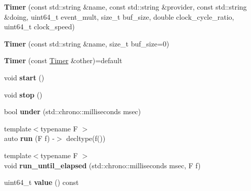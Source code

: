 \begin{DoxyCompactItemize}
\item 
\mbox{\label{class_botan_1_1_timer_a83d4e09f70865389d4aac62382e00d03}} 
{\bfseries Timer} (const std\+::string \&name, const std\+::string \&provider, const std\+::string \&doing, uint64\+\_\+t event\+\_\+mult, size\+\_\+t buf\+\_\+size, double clock\+\_\+cycle\+\_\+ratio, uint64\+\_\+t clock\+\_\+speed)
\item 
\mbox{\label{class_botan_1_1_timer_ac25601941a38110e97fac5f6e915f728}} 
{\bfseries Timer} (const std\+::string \&name, size\+\_\+t buf\+\_\+size=0)
\item 
\mbox{\label{class_botan_1_1_timer_a8274e31214574a6ca9770edadc092d93}} 
{\bfseries Timer} (const \mbox{\hyperlink{class_botan_1_1_timer}{Timer}} \&other)=default
\item 
\mbox{\label{class_botan_1_1_timer_a3631b1abb774a66a5c870f9d250d9edb}} 
void {\bfseries start} ()
\item 
\mbox{\label{class_botan_1_1_timer_a8d43e28fa369565ab503b13e85dd711f}} 
void {\bfseries stop} ()
\item 
\mbox{\label{class_botan_1_1_timer_a498b8a4251abb03f4a391f30b29260ff}} 
bool {\bfseries under} (std\+::chrono\+::milliseconds msec)
\item 
\mbox{\label{class_botan_1_1_timer_a71dae9db0b133c02fba78f21c46ab854}} 
{\footnotesize template$<$typename F $>$ }\\auto {\bfseries run} (F f) -\/$>$ decltype(f())
\item 
\mbox{\label{class_botan_1_1_timer_ad9de45e7a691b17dcec505cb57712db4}} 
{\footnotesize template$<$typename F $>$ }\\void {\bfseries run\+\_\+until\+\_\+elapsed} (std\+::chrono\+::milliseconds msec, F f)
\item 
\mbox{\label{class_botan_1_1_timer_a40955920ed9565042f1aa178a3fc6ecb}} 
uint64\+\_\+t {\bfseries value} () const

\end{DoxyCompactItemize}
